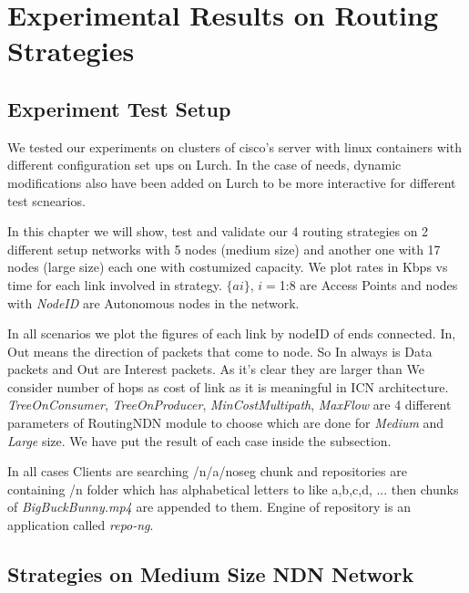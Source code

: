
\chapter{Experimental Results on Routing Strategies} %

\label{expereince}


\section{Experiment Test Setup}
We tested our experiments on clusters of cisco's server with linux containers with different configuration set ups on Lurch. In the case of needs, dynamic modifications also have been added on Lurch to be more interactive for different test scnearios.

In this chapter we will show, test and validate our 4 routing strategies on 2 different setup networks with 5 nodes (medium size) and another one with 17 nodes (large size) each one with costumized capacity. We plot rates in Kbps vs time for each link involved in strategy. $\{ai\}$, $i=$1:8 are Access Points and nodes with \textit{NodeID} are Autonomous nodes in the network.
   
In all scenarios we plot the figures of each link by nodeID of ends connected. In, Out means the direction of packets that come to node. So In always is Data packets and Out are Interest packets. As it's clear they are larger than We consider number of hops as cost of link as it is meaningful in ICN architecture.
\textit{TreeOnConsumer}, \textit{TreeOnProducer}, \textit{MinCostMultipath}, \textit{MaxFlow} are 4 different parameters of RoutingNDN module to choose which are done for \textit{Medium} and \textit{Large} size. We have put the result of each case inside the subsection.

In all cases Clients are searching /n/a/noseg chunk and repositories are containing /n folder which has alphabetical letters to like a,b,c,d, ... then chunks of \textit{BigBuckBunny.mp4} are appended to them. Engine of repository is an application called \textit{repo-ng}. 

\section{Strategies on Medium Size NDN Network}


